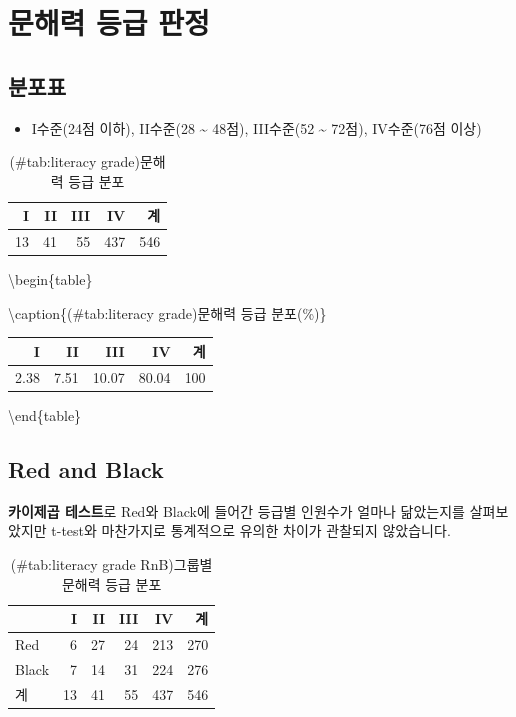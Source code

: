 \documentclass[
]{book}
\providecommand{\tightlist}{%
  \setlength{\itemsep}{0pt}\setlength{\parskip}{0pt}}
\begin{document}
\section{문해력 등급 판정}\label{uxbb38uxd574uxb825-uxb4f1uxae09-uxd310uxc815}

\subsection{분포표}\label{uxbd84uxd3ecuxd45c}

\begin{itemize}
\tightlist
\item
  I수준(24점 이하), II수준(28 \textasciitilde{} 48점), III수준(52 \textasciitilde{} 72점), IV수준(76점 이상)
\end{itemize}

\begin{table}

\caption{(\#tab:literacy grade)문해력 등급 분포}
\centering
\begin{tabular}[t]{r|r|r|r|r}
\hline
I & II & III & IV & 계\\
\hline
13 & 41 & 55 & 437 & 546\\
\hline
\end{tabular}
\end{table}

\textbackslash begin\{table\}

\textbackslash caption\{(\#tab:literacy grade)문해력 등급 분포(\%)\}
\centering

\begin{tabular}[t]{r|r|r|r|r}
\hline
I & II & III & IV & 계\\
\hline
2.38 & 7.51 & 10.07 & 80.04 & 100\\
\hline
\end{tabular}

\textbackslash end\{table\}

\subsection{Red and Black}\label{red-and-black}

\textbf{카이제곱 테스트}로 Red와 Black에 들어간 등급별 인원수가 얼마나 닮았는지를 살펴보았지만 t-test와 마찬가지로 통계적으로 유의한 차이가 관찰되지 않았습니다.

\begin{table}

\caption{(\#tab:literacy grade RnB)그룹별 문해력 등급 분포}
\centering
\begin{tabular}[t]{l|r|r|r|r|r}
\hline
  & I & II & III & IV & 계\\
\hline
Red & 6 & 27 & 24 & 213 & 270\\
\hline
Black & 7 & 14 & 31 & 224 & 276\\
\hline
계 & 13 & 41 & 55 & 437 & 546\\
\hline
\end{tabular}
\end{table}
\end{document}

